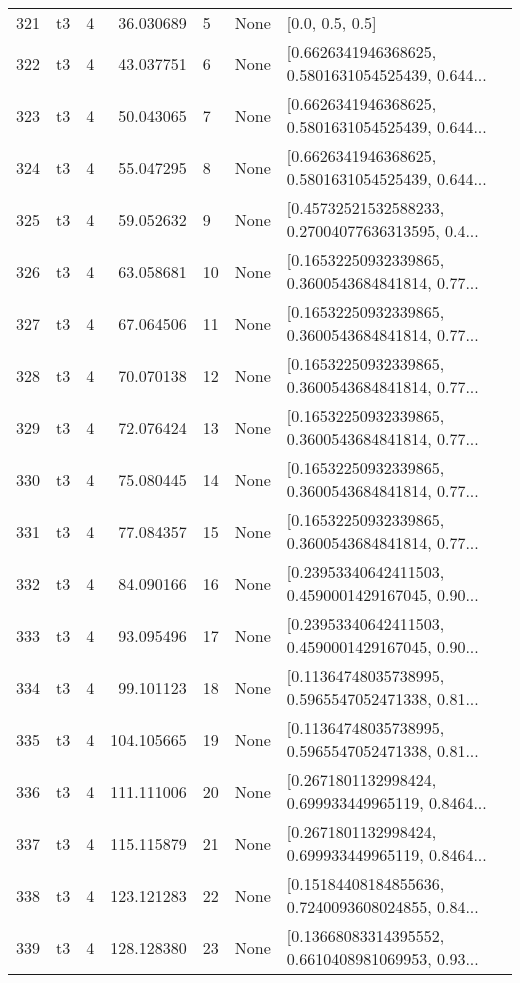 \begin{tabular}{lllrlll}
321 &  t3 &   4 &   36.030689 &    5 &  None &                                    [0.0, 0.5, 0.5] \\
322 &  t3 &   4 &   43.037751 &    6 &  None &  [0.6626341946368625, 0.5801631054525439, 0.644... \\
323 &  t3 &   4 &   50.043065 &    7 &  None &  [0.6626341946368625, 0.5801631054525439, 0.644... \\
324 &  t3 &   4 &   55.047295 &    8 &  None &  [0.6626341946368625, 0.5801631054525439, 0.644... \\
325 &  t3 &   4 &   59.052632 &    9 &  None &  [0.45732521532588233, 0.27004077636313595, 0.4... \\
326 &  t3 &   4 &   63.058681 &   10 &  None &  [0.16532250932339865, 0.3600543684841814, 0.77... \\
327 &  t3 &   4 &   67.064506 &   11 &  None &  [0.16532250932339865, 0.3600543684841814, 0.77... \\
328 &  t3 &   4 &   70.070138 &   12 &  None &  [0.16532250932339865, 0.3600543684841814, 0.77... \\
329 &  t3 &   4 &   72.076424 &   13 &  None &  [0.16532250932339865, 0.3600543684841814, 0.77... \\
330 &  t3 &   4 &   75.080445 &   14 &  None &  [0.16532250932339865, 0.3600543684841814, 0.77... \\
331 &  t3 &   4 &   77.084357 &   15 &  None &  [0.16532250932339865, 0.3600543684841814, 0.77... \\
332 &  t3 &   4 &   84.090166 &   16 &  None &  [0.23953340642411503, 0.4590001429167045, 0.90... \\
333 &  t3 &   4 &   93.095496 &   17 &  None &  [0.23953340642411503, 0.4590001429167045, 0.90... \\
334 &  t3 &   4 &   99.101123 &   18 &  None &  [0.11364748035738995, 0.5965547052471338, 0.81... \\
335 &  t3 &   4 &  104.105665 &   19 &  None &  [0.11364748035738995, 0.5965547052471338, 0.81... \\
336 &  t3 &   4 &  111.111006 &   20 &  None &  [0.2671801132998424, 0.699933449965119, 0.8464... \\
337 &  t3 &   4 &  115.115879 &   21 &  None &  [0.2671801132998424, 0.699933449965119, 0.8464... \\
338 &  t3 &   4 &  123.121283 &   22 &  None &  [0.15184408184855636, 0.7240093608024855, 0.84... \\
339 &  t3 &   4 &  128.128380 &   23 &  None &  [0.13668083314395552, 0.6610408981069953, 0.93... \\

\end{tabular}
